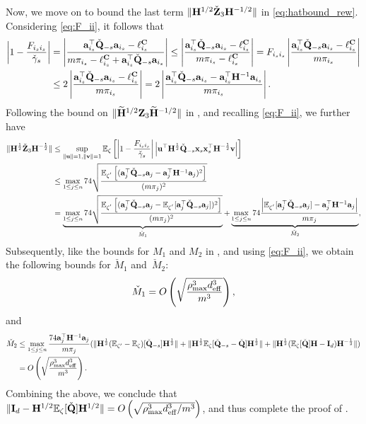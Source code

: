 \documentclass[11pt,a4paper]{article}
\begin{document}
Now, we move on to bound the last term $\|\mathbf{H}^{1/2}\check{\mathbf{Z}}_3\mathbf{H}^{-1/2}\|$ in \eqref{eq:hatbound_rew}. 
Considering \eqref{eq:F_ii},  it follows that
\begin{align}\label{eq:1-f_ii}
 \left| 1-\frac{F_{i_si_s}}{\check \gamma_s}\right|&=\left| \frac{\mathbf{a}_{i_s}^\top \check{\mathbf{Q}}_{-s}\mathbf{a}_{i_s}-\ell^{\mathbf{C}}_{i_s}}{m\pi_{i_s}-\ell^{\mathbf{C}}_{i_s}+\mathbf{a}_{i_s}^\top \check{\mathbf{Q}}_{-s}\mathbf{a}_{i_s}}\right|\leq\left| \frac{\mathbf{a}_{i_s}^\top \check{\mathbf{Q}}_{-s}\mathbf{a}_{i_s}-\ell^{\mathbf{C}}_{i_s}}{m\pi_{i_s}-\ell^{\mathbf{C}}_{i_s}}\right| =F_{i_si_s}\left| \frac{\mathbf{a}_{i_s}^\top \check{\mathbf{Q}}_{-s}\mathbf{a}_{i_s}-\ell^{\mathbf{C}}_{i_s}}{m\pi_{i_s}}\right|\nonumber\\
 &\leq2\left| \frac{\mathbf{a}_{i_s}^\top \check{\mathbf{Q}}_{-s}\mathbf{a}_{i_s}-\ell^{\mathbf{C}}_{i_s}}{m\pi_{i_s}}\right|= 2\left| \frac{\mathbf{a}_{i_s}^\top \check{\mathbf{Q}}_{-s}\mathbf{a}_{i_s}-\mathbf{a}_{i_s}^\top\mathbf{H}^{-1}\mathbf{a}_{i_s}}{m\pi_{i_s}}\right|.
\end{align}
Following the bound on $ \|\widetilde{\mathbf{H}}^{1/2}\mathbf{Z}_3\widetilde{\mathbf{H}}^{-1/2}\|$ in , and recalling \eqref{eq:F_ii}, we further have
\begin{align}
    \|\mathbf{H}^{\frac{1}{2}}\check{\mathbf{Z}}_3\mathbf{H}^{-\frac{1}{2}}\|&\leq   \sup\limits_{\|\mathbf{u}\|=1,\|\mathbf{v}\|=1}
     {\mathbb{E}}_{\zeta} \left[\left| 1-\frac{F_{i_si_s}}{\check \gamma_s} \right|\left|\mathbf{u}^\top\mathbf{H}^{\frac{1}{2}}   \check{\mathbf{Q}}_{-s}\mathbf{x}_s\mathbf{x}^\top_s \mathbf{H}^{-\frac{1}{2}}\mathbf{v} \right| \right] \nonumber \\ 
     &\leq  \max\limits_{1\leq j\leq n} 74   \sqrt{ \frac{{\mathbb{E}}_{\zeta^{'}} \left[(\mathbf{a}_{j}^\top \check{\mathbf{Q}}_{-s}\mathbf{a}_{j}-\mathbf{a}_{j}^\top\mathbf{H}^{-1}\mathbf{a}_{j})^2 \right]}{(m\pi_{j})^2} }\nonumber\\  
     & =\underbrace{ \max\limits_{1\leq j\leq n}74   \sqrt{\frac{{\mathbb{E}}_{\zeta^{'}} \left[(\mathbf{a}_{j}^\top \check{\mathbf{Q}}_{-s}\mathbf{a}_{j}-{\mathbb{E}}_{\zeta^{'}}[\mathbf{a}_{j}^\top \check{\mathbf{Q}}_{-s}\mathbf{a}_{j}])^2
     \right]}{(m\pi_{j})^2}
}}_{\check{M}_1} +
    \underbrace{ \max\limits_{1\leq j\leq n} 74\frac{\left|{\mathbb{E}}_{\zeta^{'}}[\mathbf{a}_{j}^\top \check{\mathbf{Q}}_{-s}\mathbf{a}_{j}]-\mathbf{a}_{j}^\top\mathbf{H}^{-1}\mathbf{a}_{j}\right|}{m\pi_{j}}
     }_{\check{M}_2}, \label{eq: hat_z_3}
\end{align}
Subsequently, like the bounds for $ M_1$ and $M_2$ in , and using \eqref{eq:F_ii}, we obtain the following bounds for $\check{M}_1$ and~$\check{M}_2$: 
 \begin{align*}
  \check{M}_1 = O\left(\sqrt{\frac{\rho_{\max}^3 d^3_{\mathrm{eff}}}{m^3}}\right),
 \end{align*}
 and
 \begin{align*}
  \check{M}_2  &\leq \max\limits_{1\leq j\leq n}\frac{ 74 \mathbf{a}_j^\top \mathbf{H}^{-1}\mathbf{a}_j}{m\pi_{j}}(\|\mathbf{H}^{\frac{1}{2}}({\mathbb{E}}_{\zeta'}-{\mathbb{E}}_{\zeta})[ \check{\mathbf{Q}}_{-s}]\mathbf{H}^{\frac{1}{2}}\|+\|\mathbf{H}^{\frac{1}{2}}{\mathbb{E}}_{\zeta}[ \check{\mathbf{Q}}_{-s}- \check{\mathbf{Q}}]\mathbf{H}^{\frac{1}{2}}\|+\|\mathbf{H}^{\frac{1}{2}}({\mathbb{E}}_{\zeta}[ \check{\mathbf{Q}}]\mathbf{H}-\mathbf{I}_d)\mathbf{H}^{-\frac{1}{2}}\|)\\
  &= O\left(\sqrt{\frac{\rho_{\max}^3 d^3_{\mathrm{eff}}} {m^3}}\right).\nonumber 
 \end{align*}
Combining the above, we conclude that $\|\mathbf{I}_d-\mathbf{H}^{1/2}{\mathbb{E}}_{\zeta}[ \check{\mathbf{Q}} ]\mathbf{H}^{1/2}\| = O\left(\sqrt{\rho_{\max}^3 d^3_{\mathrm{eff}}/m^3}\right)$, and thus complete the proof of .
\qedwhite
\end{document}
